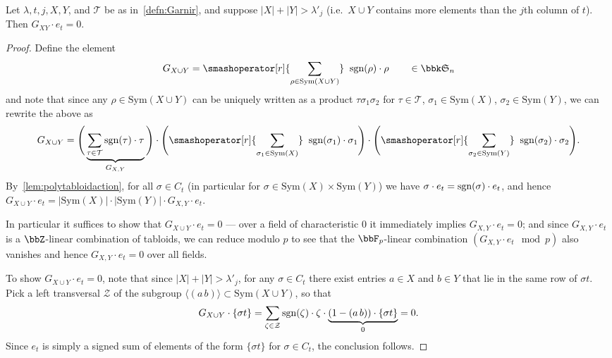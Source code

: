 \begin{proposition}[(Peel, '75)]
    Let $\lambda,t,j,X,Y$, and $\mathcal{T}$ be as in~\cref{defn:Garnir}, and
    suppose $|X|+|Y| > \lambda'_j$ (i.e.\ $X\cup Y$ contains more
    elements than the $j$th column of $t$). Then $G_{XY}\cdot e_t=0$.

    \begin{proof}
        Define the element \[G_{X\cup Y}=\smashoperator[r]{\sum_{\rho\in
            \text{Sym}(X\cup Y)}}\;\; \sgn(\rho)\cdot
        \rho\qquad \in \bbk \sym n\]
        and note that since any $\rho\in \text{Sym}(X\cup Y)$ can be uniquely
        written as a product $\tau\sigma_1\sigma_2$ for $\tau\in\mathcal{T}$,
        $\sigma_1\in \text{Sym}(X)$, $\sigma_2\in \text{Sym}(Y)$, we can rewrite
        the above as 
        \[
            G_{X\cup Y}= 
            \Bigg( \underbrace{\sum_{\tau\in
            \mathcal{T}}\sgn(\tau)\cdot \tau}_{G_{X,Y}} \Bigg) \cdot
            \Bigg(\smashoperator[r]{\sum_{\sigma_1\in
            \text{Sym}(X)}}\;\;\sgn(\sigma_1)\cdot \sigma_1\Bigg) \cdot
            \Bigg(\smashoperator[r]{\sum_{\sigma_2\in
            \text{Sym}(Y)}}\;\;\sgn(\sigma_2)\cdot \sigma_2\Bigg). 
        \]
        By~\cref{lem:polytabloidaction}, for all $\sigma\in C_t$ (in particular
        for $\sigma\in \text{Sym}(X)\times \text{Sym}(Y)$) we have $\sigma\cdot
        e_t = \textnormal{sgn}(\sigma)\cdot e_t$, and hence $G_{X\cup Y}\cdot e_t =
        |\text{Sym}(X)|\cdot |\text{Sym}(Y)|\cdot G_{X,Y}\cdot e_t$. 
        
        In
        particular it suffices to show that $G_{X\cup Y}\cdot e_t=0$ --- over a
        field of characteristic $0$ it immediately implies $G_{X, Y}\cdot
        e_t=0$; and since $G_{X,Y}\cdot e_t$ is a $\bbZ$-linear combination of
        tabloids, we can reduce modulo $p$ to see that the $\bbF_p$-linear
        combination $(G_{X,Y}\cdot e_t \mod{p})$ also vanishes and hence
        $G_{X,Y}\cdot e_t=0$ over all fields.

        To show $G_{X\cup Y}\cdot e_t=0$, note that since $|X|+|Y|>\lambda'_j$,
        for any $\sigma\in C_t$ there exist entries $a\in X$ and $b\in Y$ that
        lie in the same row of $\sigma t$. Pick a left transversal $\mathcal{Z}$
        of the subgroup $\langle (a\,b)\rangle\subset \text{Sym}(X\cup Y)$, so
        that 
        \[
            G_{X\cup Y}\cdot \{\sigma t\} =
            \sum_{\zeta\in\mathcal{Z}}\textnormal{sgn}(\zeta)\cdot 
            \zeta \cdot \underbrace{(1-(a\,b))\cdot \{\sigma t\}}_{0} = 0.
        \]
        Since $e_t$ is simply a signed sum of elements of the form $\{\sigma t\}$ for
        $\sigma \in C_t$, the conclusion follows.
    \end{proof}
\end{proposition}

